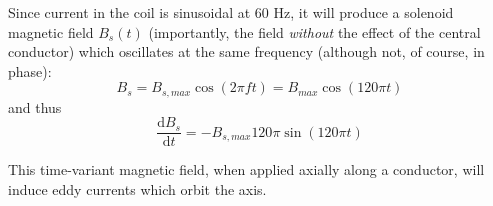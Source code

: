 \documentclass[]{article}
\begin{document}
\par Since current in the coil is sinusoidal at 60 Hz, it will produce a solenoid magnetic field $B_s(t)$ (importantly, the field \emph{without} the effect of the central conductor) which oscillates at the same frequency (although not, of course, in phase):
\begin{equation}
B_s=B_{s,max}\cos(2\pi f t)=B_{max}\cos(120\pi t)
\end{equation}
and thus
\begin{equation}
\frac{\mathrm{d}B_s}{\mathrm{d}t}=-B_{s,max}120\pi\sin(120\pi t)
\label{eqn:dbdt}
\end{equation}
\par This time-variant magnetic field, when applied axially along a conductor, will induce eddy currents which orbit the axis. 
\end{document}
